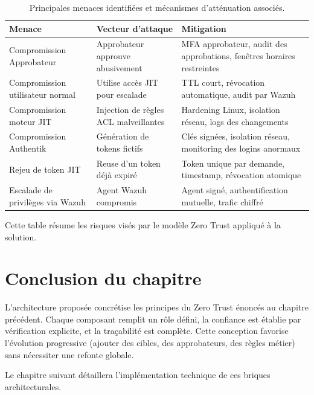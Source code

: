 \begin{table}[h]
\centering
\begin{tabularx}{\textwidth}{|l|p{4cm}|p{4cm}|}
\hline
\textbf{Menace} & \textbf{Vecteur d'attaque} & \textbf{Mitigation} \\
\hline
Compromission Approbateur & Approbateur approuve abusivement & MFA approbateur, audit des approbations, fenêtres horaires restreintes \\
\hline
Compromission utilisateur normal & Utilise accès JIT pour escalade & TTL court, révocation automatique, audit par Wazuh \\
\hline
Compromission moteur JIT & Injection de règles ACL malveillantes & Hardening Linux, isolation réseau, logs des changements \\
\hline
Compromission Authentik & Génération de tokens fictifs & Clés signées, isolation réseau, monitoring des logins anormaux \\
\hline
Rejeu de token JIT & Reuse d'un token déjà expiré & Token unique par demande, timestamp, révocation atomique \\
\hline
Escalade de privilèges via Wazuh & Agent Wazuh compromis & Agent signé, authentification mutuelle, trafic chiffré \\
\hline
\end{tabularx}
\caption{Principales menaces identifiées et mécanismes d'atténuation associés.}
\end{table}

Cette table résume les risques visés par le modèle Zero Trust appliqué à la solution.

\section{Conclusion du chapitre}

L'architecture proposée concrétise les principes du Zero Trust énoncés au chapitre précédent. Chaque composant remplit un rôle défini, la confiance est établie par vérification explicite, et la traçabilité est complète. Cette conception favorise l'évolution progressive (ajouter des cibles, des approbateurs, des règles métier) sans nécessiter une refonte globale.

Le chapitre suivant détaillera l'implémentation technique de ces briques architecturales.
